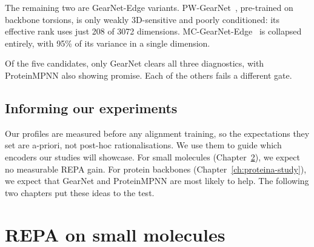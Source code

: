 \documentclass[12pt,a4paper,twoside]{report}
\begin{document}
The remaining two are GearNet-Edge variants. PW-GearNet~\cite{GearNet,ProteinWorkshop}, pre-trained on backbone torsions, is only weakly 3D-sensitive and poorly conditioned: its effective rank uses just 208 of 3072 dimensions. MC-GearNet-Edge~\cite{GearNet} is collapsed entirely, with 95\% of its variance in a single dimension.

Of the five candidates, only GearNet clears all three diagnostics, with ProteinMPNN also showing promise. Each of the others fails a different gate.

\section{Informing our experiments}
\label{sec:profiling-predictions}

Our profiles are measured before any alignment training, so the expectations they set are a-priori, not post-hoc rationalisations. We use them to guide which encoders our studies will showcase. For small molecules (Chapter~\ref{ch:tabasco-study}), we expect no measurable REPA gain. For protein backbones (Chapter~\ref{ch:proteina-study}), we expect that GearNet and ProteinMPNN are most likely to help. The following two chapters put these ideas to the test.

\chapter{REPA on small molecules}
\label{ch:tabasco-study}

%
%
\end{document}
